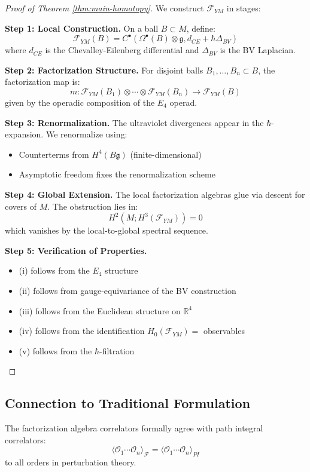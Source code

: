 \begin{proof}[Proof of Theorem \ref{thm:main-homotopy}]
We construct $\mathcal{F}_{YM}$ in stages:

\textbf{Step 1: Local Construction.}
On a ball $B \subset M$, define:
\[
\mathcal{F}_{YM}(B) = C^\bullet(\Omega^\bullet(B) \otimes \mathfrak{g}, d_{CE} + \hbar \Delta_{BV})
\]
where $d_{CE}$ is the Chevalley-Eilenberg differential and $\Delta_{BV}$ is the BV Laplacian.

\textbf{Step 2: Factorization Structure.}
For disjoint balls $B_1, \ldots, B_n \subset B$, the factorization map is:
\[
m: \mathcal{F}_{YM}(B_1) \otimes \cdots \otimes \mathcal{F}_{YM}(B_n) \to \mathcal{F}_{YM}(B)
\]
given by the operadic composition of the $E_4$ operad.

\textbf{Step 3: Renormalization.}
The ultraviolet divergences appear in the $\hbar$-expansion. We renormalize using:
\begin{itemize}
    \item Counterterms from $H^4(B\mathfrak{g})$ (finite-dimensional)
    \item Asymptotic freedom fixes the renormalization scheme
\end{itemize}

\textbf{Step 4: Global Extension.}
The local factorization algebras glue via descent for covers of $M$. The obstruction lies in:
\[
H^2(M; H^3(\mathcal{F}_{YM})) = 0
\]
which vanishes by the local-to-global spectral sequence.

\textbf{Step 5: Verification of Properties.}
\begin{itemize}
    \item (i) follows from the $E_4$ structure
    \item (ii) follows from gauge-equivariance of the BV construction
    \item (iii) follows from the Euclidean structure on $\mathbb{R}^4$
    \item (iv) follows from the identification $H_0(\mathcal{F}_{YM}) = $ observables
    \item (v) follows from the $\hbar$-filtration
\end{itemize}
\end{proof}

\subsection{Connection to Traditional Formulation}

\begin{theorem}
The factorization algebra correlators formally agree with path integral correlators:
\[
\langle \mathcal{O}_1 \cdots \mathcal{O}_n \rangle_{\mathcal{F}} = \langle \mathcal{O}_1 \cdots \mathcal{O}_n \rangle_{PI}
\]
to all orders in perturbation theory.
\end{theorem}

